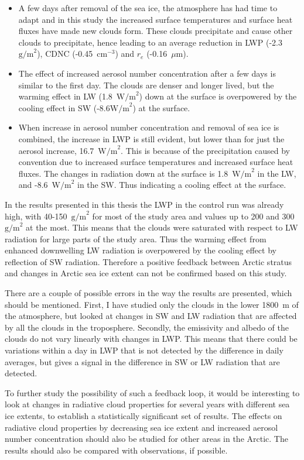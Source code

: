 \begin{itemize}
\item A few days after removal of the sea ice, the atmosphere has had time to adapt and in this study the increased surface temperatures and surface heat fluxes have made new clouds form. These clouds precipitate and cause other clouds to precipitate, hence leading to an average reduction in LWP (-2.3~$\text{g/m}^2$), CDNC (-0.45~$\text{cm}^{-3}$) and $r_e$ (-0.16~$\mu\text{m}$).
\item The effect of increased aerosol number concentration after a few days is similar to the first day. The clouds are denser and longer lived, but the warming effect in LW (1.8~$\text{W/m}^2$) down at the surface is overpowered by the cooling effect in SW (-8.6$\text{W/m}^2$) at the surface.
\item When increase in aerosol number concentration and removal of sea ice is combined, the increase in LWP is still evident, but lower than for just the aerosol increase, 16.7~$\text{W/m}^2$. This is because of the precipitation caused by convention due to increased surface temperatures and increased surface heat fluxes. The changes in radiation down at the surface is 1.8~$\text{W/m}^2$ in the LW, and -8.6~$\text{W/m}^2$ in the SW. Thus indicating a cooling effect at the surface.
\end{itemize}

In the results presented in this thesis the LWP in the control run was already high, with 40-150~$\text{g/m}^2$ for most of the study area and values up to 200 and 300~$\text{g/m}^2$ at the most. This means that the clouds were saturated with respect to LW radiation for large parts of the study area. Thus the warming effect from enhanced downwelling LW radiation is overpowered by the cooling effect by reflection of SW radiation. Therefore a positive feedback between Arctic stratus and changes in Arctic sea ice extent can not be confirmed based on this study.

There are a couple of possible errors in the way the results are presented, which should be mentioned. First, I have studied only the clouds in the lower 1800~m of the atmosphere, but looked at changes in SW and LW radiation that are affected by all the clouds in the troposphere. Secondly, the emissivity and albedo of the clouds do not vary linearly with changes in LWP. This means that there could be variations within a day in LWP that is not detected by the difference in daily averages, but gives a signal in the difference in SW or LW radiation that are detected.

To further study the possibility of such a feedback loop, it would be interesting to look at changes in radiative cloud properties for several years with different sea ice extents, to establish a statistically significant set of results. The effects on radiative cloud properties by decreasing sea ice extent and increased aerosol number concentration should also be studied for other areas in the Arctic. The results should also be compared with observations, if possible.

